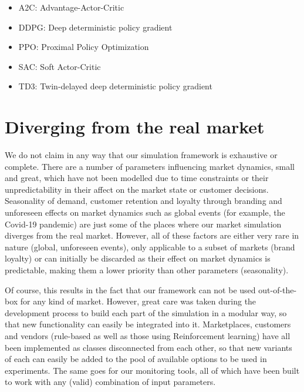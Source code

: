 \begin{enumerate}
\begin{itemize}
		            \begin{itemize}
			            \item A2C: Advantage-Actor-Critic
			            \item DDPG: Deep deterministic policy gradient
			            \item PPO: Proximal Policy Optimization
			            \item SAC: Soft Actor-Critic
			            \item TD3: Twin-delayed deep deterministic policy gradient
		            \end{itemize}
	      \end{itemize}
\end{enumerate}


\section{Diverging from the real market}

We do not claim in any way that our simulation framework is exhaustive or complete. There are a number of parameters influencing market dynamics, small and great, which have not been modelled due to time constraints or their unpredictability in their affect on the market state or customer decisions. Seasonality of demand, customer retention and loyalty through branding and unforeseen effects on market dynamics such as global events (for example, the Covid-19 pandemic) are just some of the places where our market simulation diverges from the real market. However, all of these factors are either very rare in nature (global, unforeseen events), only applicable to a subset of markets (brand loyalty) or can initially be discarded as their effect on market dynamics is predictable, making them a lower priority than other parameters (seasonality).

Of course, this results in the fact that our framework can not be used out-of-the-box for any kind of market. However, great care was taken during the development process to build each part of the simulation in a modular way, so that new functionality can easily be integrated into it. Marketplaces, customers and vendors (rule-based as well as those using Reinforcement learning) have all been implemented as classes disconnected from each other, so that new variants of each can easily be added to the pool of available options to be used in experiments. The same goes for our monitoring tools, all of which have been built to work with any (valid) combination of input parameters.
